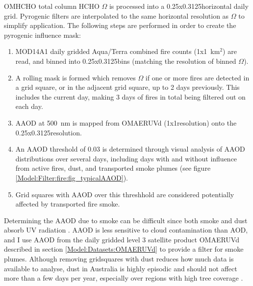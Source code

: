     OMHCHO total column HCHO $\Omega$ is processed into a 0.25x0.3125\degr horizontal daily grid.
    Pyrogenic filters are interpolated to the same horizontal resolution as $\Omega$ to simplify application. 
    The following steps are performed in order to create the pyrogenic influence mask:
    \begin{enumerate}
      \item MOD14A1 daily gridded Aqua/Terra combined fire counts (1x1~km$^2$) are read, and binned into 0.25x0.3125\degr bins (matching the resolution of binned $\Omega$).
      \item A rolling mask is formed which removes $\Omega$ if one or more fires are detected in a grid square, or in the adjacent grid square, up to 2 days previously.
      This includes the current day, making 3 days of fires in total being filtered out on each day.
      \item AAOD at 500~nm is mapped from OMAERUVd (1x1\degr resolution) onto the 0.25x0.3125\degr resolution.
      \item An AAOD threshold of 0.03 is determined through visual analysis of AAOD distributions over several days, including days with and without influence from active fires, dust, and transported smoke plumes (see figure \ref{Model:Filter:fire:fig_typicalAAOD}).
      \item Grid squares with AAOD over this threshhold are considered potentially affected by transported fire smoke.
    \end{enumerate}
  
    Determining the AAOD due to smoke can be difficult since both smoke and dust absorb UV radiation \parencite{Ahn2008,Marais2012}.
    AAOD is less sensitive to cloud contamination than AOD, and I use AAOD from the daily gridded level 3 satellite product OMAERUVd \parencite{Ahn2008} described in section \ref{Model:Datasets:OMAERUVd} to provide a filter for smoke plumes.
    Although removing gridsquares with dust reduces how much data is available to analyse, dust in Australia is highly episodic and should not affect more than a few days per year, especially over regions with high tree coverage \parencite{Shao2007}.
    
